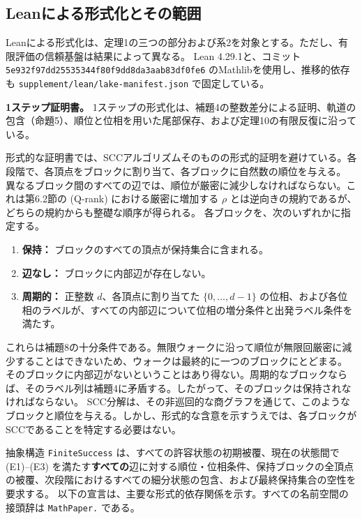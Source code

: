 \documentclass[11pt,reqno]{amsart}
\theoremstyle{definition}
\theoremstyle{definition}
\theoremstyle{remark}
\providecommand{\tightlist}{\setlength{\itemsep}{0pt}\setlength{\parskip}{0pt}}
\begin{document}
\subsection{Leanによる形式化とその範囲}\label{sec:9.4}

Leanによる形式化は、定理1の三つの部分および系2を対象とする。ただし、有限評価の信頼基盤は結果によって異なる。
Lean 4.29.1と、コミット
\nolinkurl{5e932f97dd25535344f80f9dd8da3aab83df0fe6}
のMathlibを使用し、推移的依存も \nolinkurl{supplement/lean/lake-manifest.json} で固定している。

\textbf{1ステップ証明書。} 1ステップの形式化は、補題4の整数差分による証明、軌道の包含（命題5）、順位と位相を用いた尾部保存、および定理10の有限反復に沿っている。

形式的な証明書では、SCCアルゴリズムそのものの形式的証明を避けている。各段階で、各頂点をブロックに割り当て、各ブロックに自然数の順位を与える。
異なるブロック間のすべての辺では、順位が厳密に減少しなければならない。これは第6.2節の (Q-rank) における厳密に増加する \(\rho\) とは逆向きの規約であるが、どちらの規約からも整礎な順序が得られる。
各ブロックを、次のいずれかに指定する。

\begin{enumerate}
\def\labelenumi{\arabic{enumi}.}
\tightlist
\item
  \textbf{保持：} ブロックのすべての頂点が保持集合に含まれる。
\item
  \textbf{辺なし：} ブロックに内部辺が存在しない。
\item
  \textbf{周期的：} 正整数 \(d\)、各頂点に割り当てた \(\{0,\ldots,d-1\}\) の位相、および各位相のラベルが、すべての内部辺について位相の増分条件と出発ラベル条件を満たす。
\end{enumerate}

これらは補題8の十分条件である。無限ウォークに沿って順位が無限回厳密に減少することはできないため、ウォークは最終的に一つのブロックにとどまる。
そのブロックに内部辺がないということはあり得ない。周期的なブロックならば、そのラベル列は補題4に矛盾する。したがって、そのブロックは保持されなければならない。
SCC分解は、その非巡回的な商グラフを通じて、このようなブロックと順位を与える。しかし、形式的な含意を示すうえでは、各ブロックがSCCであることを特定する必要はない。

抽象構造 \texttt{FiniteSuccess} は、すべての許容状態の初期被覆、現在の状態間で (E1)--(E3) を満たす\textbf{すべての}辺に対する順位・位相条件、保持ブロックの全頂点の被覆、次段階におけるすべての細分状態の包含、および最終保持集合の空性を要求する。
以下の宣言は、主要な形式的依存関係を示す。すべての名前空間の接頭辞は \texttt{MathPaper.} である。
\end{document}

